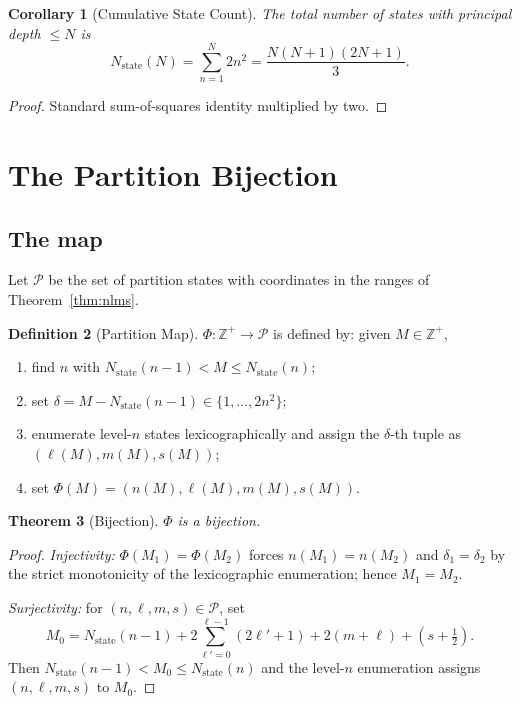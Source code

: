 \documentclass[twocolumn,10pt,a4paper]{article}
\theoremstyle{thmstyle}
\newtheorem{theorem}{Theorem}[section]
\newtheorem{corollary}[theorem]{Corollary}
\theoremstyle{definition}
\newtheorem{definition}[theorem]{Definition}
\theoremstyle{remark}
\newcommand{\Zp}{\mathbb{Z}^{+}}
\newcommand{\Parts}{\mathcal{P}}
\newcommand{\PhiMap}{\varPhi}
\begin{document}
\begin{corollary}[Cumulative State Count]
\label{cor:cum}
The total number of states with principal depth $\leq N$ is
\begin{equation}
N_{\mathrm{state}}(N)=\sum_{n=1}^{N}2n^{2}=\frac{N(N+1)(2N+1)}{3}.
\label{eq:Ns}
\end{equation}
\end{corollary}

\begin{proof}
Standard sum-of-squares identity multiplied by two.
\end{proof}

\section{The Partition Bijection}
\label{sec:bijection}

\subsection{The map}

Let $\Parts$ be the set of partition states with coordinates in the
ranges of Theorem~\ref{thm:nlms}.

\begin{definition}[Partition Map]
\label{def:phi}
$\PhiMap:\Zp\to\Parts$ is defined by: given $M\in\Zp$,
\begin{enumerate}[nosep,leftmargin=*]
\item find $n$ with $N_{\mathrm{state}}(n-1)<M\leq N_{\mathrm{state}}(n)$;
\item set $\delta=M-N_{\mathrm{state}}(n-1)\in\{1,\ldots,2n^{2}\}$;
\item enumerate level-$n$ states lexicographically and assign the
$\delta$-th tuple as $(\ell(M),m(M),s(M))$;
\item set $\PhiMap(M)=(n(M),\ell(M),m(M),s(M))$.
\end{enumerate}
\end{definition}

\begin{theorem}[Bijection]
\label{thm:bij}
$\PhiMap$ is a bijection.
\end{theorem}

\begin{proof}
\emph{Injectivity:} $\PhiMap(M_{1})=\PhiMap(M_{2})$ forces
$n(M_{1})=n(M_{2})$ and $\delta_{1}=\delta_{2}$ by the strict
monotonicity of the lexicographic enumeration; hence $M_{1}=M_{2}$.

\emph{Surjectivity:} for $(n,\ell,m,s)\in\Parts$, set
\[
M_{0}=N_{\mathrm{state}}(n-1)+2\sum_{\ell'=0}^{\ell-1}(2\ell'+1)
+2(m+\ell)+(s+\tfrac{1}{2}).
\]
Then $N_{\mathrm{state}}(n-1)<M_{0}\leq N_{\mathrm{state}}(n)$ and the
level-$n$ enumeration assigns $(n,\ell,m,s)$ to $M_{0}$.
\end{proof}
\end{document}
